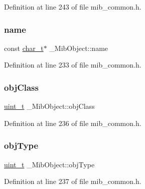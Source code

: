 Definition at line 243 of file mib\+\_\+common.\+h.

\mbox{\label{struct__MibObject_a09032e1c6636e7e232f5c21df3e7a331}} 
\subsubsection{\texorpdfstring{name}{name}}
{\footnotesize\ttfamily const \hyperlink{compiler__port_8h_a40bb5262bf908c328fbcfbe5d29d0201}{char\+\_\+t}$\ast$ \+\_\+\+Mib\+Object\+::name}



Definition at line 233 of file mib\+\_\+common.\+h.

\mbox{\label{struct__MibObject_ad70ebfaaada8db2560dbe2f3dafeedd8}} 
\subsubsection{\texorpdfstring{obj\+Class}{objClass}}
{\footnotesize\ttfamily \hyperlink{compiler__port_8h_a12a1e9b3ce141648783a82445d02b58d}{uint\+\_\+t} \+\_\+\+Mib\+Object\+::obj\+Class}



Definition at line 236 of file mib\+\_\+common.\+h.

\mbox{\label{struct__MibObject_aa77da1505d2929cd5a32d3050e7d924a}} 
\subsubsection{\texorpdfstring{obj\+Type}{objType}}
{\footnotesize\ttfamily \hyperlink{compiler__port_8h_a12a1e9b3ce141648783a82445d02b58d}{uint\+\_\+t} \+\_\+\+Mib\+Object\+::obj\+Type}



Definition at line 237 of file mib\+\_\+common.\+h.

\mbox{\label{struct__MibObject_a966a91f480cb9e111ab4f739c921ddc5}} 
